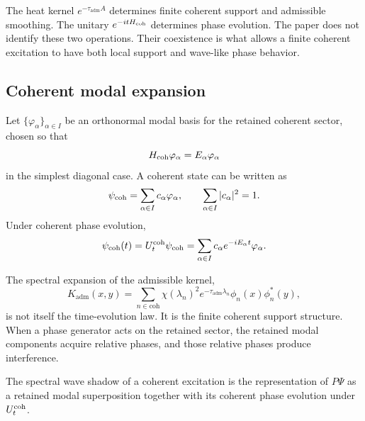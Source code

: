 \documentclass[11pt]{article}
\newcommand{\Kadm}{K_{\mathrm{adm}}}
\newcommand{\ta}{\tau_{\mathrm{adm}}}
\newcommand{\coh}{\mathrm{coh}}
\begin{document}
\begin{remark}
\label{rem:no-conflation}
The heat kernel \(e^{-\ta A}\) determines finite coherent support and admissible smoothing.
The unitary \(e^{-itH_{\rm coh}}\) determines phase evolution. The paper does not identify
these two operations. Their coexistence is what allows a finite coherent excitation to have
both local support and wave-like phase behavior.
\end{remark}

\subsection{Coherent modal expansion}
\label{subsec:coherent-modal-expansion}

Let \(\{\varphi_\alpha\}_{\alpha\in I}\) be an orthonormal modal basis for the retained coherent
sector, chosen so that
\begin{equation}
  H_{\rm coh}\varphi_\alpha
  =
  E_\alpha\varphi_\alpha
\end{equation}
in the simplest diagonal case. A coherent state can be written as
\begin{equation}
  \psi_{\rm coh}
  =
  \sum_{\alpha\in I}
  c_\alpha\varphi_\alpha,
  \qquad
  \sum_{\alpha\in I}|c_\alpha|^2=1.
  \label{eq:coherent-state-expansion}
\end{equation}
Under coherent phase evolution,
\begin{equation}
  \psi_{\rm coh}(t)
  =
  U_t^{\rm coh}\psi_{\rm coh}
  =
  \sum_{\alpha\in I}
  c_\alpha e^{-iE_\alpha t}\varphi_\alpha.
  \label{eq:coherent-phase-expansion}
\end{equation}

The spectral expansion of the admissible kernel,
\begin{equation}
  \Kadm(x,y)
  =
  \sum_{n\in\coh}
  \chi(\lambda_n)^2e^{-\ta\lambda_n}
  \phi_n(x)\phi_n^\ast(y),
\end{equation}
is not itself the time-evolution law. It is the finite coherent support structure. When a
phase generator acts on the retained sector, the retained modal components acquire relative
phases, and those relative phases produce interference.

\begin{definition}
\label{def:spectral-wave-shadow}
The spectral wave shadow of a coherent excitation is the representation of \(P\Psi\) as a
retained modal superposition together with its coherent phase evolution under
\(U_t^{\rm coh}\).
\end{definition}
\end{document}
